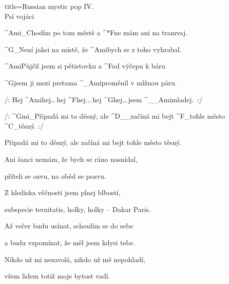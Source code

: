 \begin{song}{title=\predtitle\centering Russian mystic pop IV. \\\large Psí vojáci  \vspace*{-0.3cm}}  %
\begin{centerjustified}
\nejnejvetsi

\sloka 
	^{Ami{\color{white}\_}}Chodím po tom městě a ^*{F\:}ne mám ani na tramvaj.
	
	^{G{\color{white}\_}}Není jaksi na místě, že ^{Ami}bych se z toho vyhrabal.
	
	^{Ami}Půjčil jsem si pětistovku a ^{F}od výčepu k báru
	
	^{G}jsem ji mezi prstama ^{{\color{white}\_}Ami}proměnil v mlžnou páru.
	
	/: Hej ^{Ami\phantom{dddd}}hej\elipsa\dots\,hej ^{F\phantom{dddd}}hej\elipsa.\elipsa.\elipsa.\,hej ^{G\phantom{dddddd}}hej\elipsa\dots\,jsem ^{{\color{white}\_\_}Ami\:\:}mladej.~:/
	
	 /: ^{Gmi{\color{white}\_}}Připadá mi to děsný, ale ^{D{\color{white}\_\_}}začíná mi bejt ^{F{\color{white}\_}}tohle město ^{C{\color{white}\_}}těsný. :/

	 Připadá mi to děsný, ale začíná mi bejt tohle město těsný.

\sloka
	Ani šanci nemám, že bych se ráno nasnídal,
	
	příteli se ozvu, na oběd se pozvu.
	
	Z hlediska věčnosti jsem plnej blbostí,
	
	subspecie ternitatis, holky, holky -- Dakar Paris.


\sloka
	Až večer budu usínat, schoulím se do sebe
	
	a budu vzpomínat, že měl jsem kdysi tebe.
	
	Nikdo už mi nezavolá, nikdo už mě nepohladí,
	
	všem lidem totiž moje bytost vadí.


\end{centerjustified}
\setcounter{Slokočet}{0}
\end{song}
